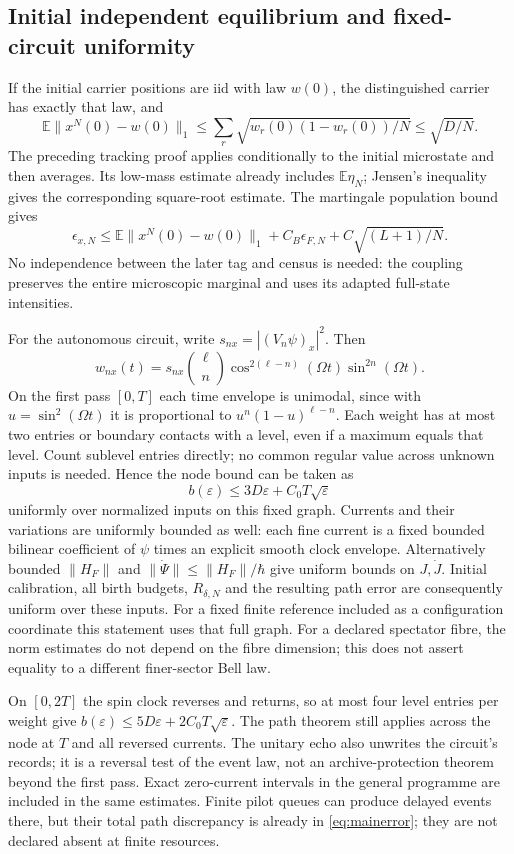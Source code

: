 \documentclass[11pt]{article}
\theoremstyle{definition}\newtheorem{definition}[theorem]{Definition}
\theoremstyle{remark}\newtheorem{remark}[theorem]{Remark}
\newcommand{\E}{\mathbb E}\newcommand{\Prb}{\mathbb P}
\begin{document}
\subsection{Initial independent equilibrium and fixed-circuit uniformity}
If the initial carrier positions are iid with law $w(0)$, the distinguished carrier has exactly that law, and
\[
 \E\|x^N(0)-w(0)\|_1
 \le \sum_r\sqrt{w_r(0)(1-w_r(0))/N}\le\sqrt{D/N}.
\]
The preceding tracking proof applies conditionally to the initial microstate and then averages. Its low-mass estimate already includes $\mathbb E\eta_N$; Jensen's inequality gives the corresponding square-root estimate. The martingale population bound gives
\[
 \epsilon_{x,N}\le \E\|x^N(0)-w(0)\|_1
       +C_B\epsilon_{F,N}+C\sqrt{(L+1)/N}.
\]
No independence between the later tag and census is needed: the coupling preserves the entire microscopic marginal and uses its adapted full-state intensities.

For the autonomous circuit, write $s_{nx}=|(V_n\psi)_x|^2$. Then
\[
 w_{nx}(t)=s_{nx}\binom{\ell}{n}
  \cos^{2(\ell-n)}(\Omega t)\sin^{2n}(\Omega t).
\]
On the first pass $[0,T]$ each time envelope is unimodal, since with $u=\sin^2(\Omega t)$ it is proportional to $u^n(1-u)^{\ell-n}$. Each weight has at most two entries or boundary contacts with a level, even if a maximum equals that level. Count sublevel entries directly; no common regular value across unknown inputs is needed. Hence the node bound can be taken as
\[
 b(\varepsilon)\le 3D\varepsilon+C_0T\sqrt\varepsilon
\]
uniformly over normalized inputs on this fixed graph. Currents and their variations are uniformly bounded as well: each fine current is a fixed bounded bilinear coefficient of $\psi$ times an explicit smooth clock envelope. Alternatively bounded $\|H_F\|$ and $\|\dot\Psi\|\le\|H_F\|/\hbar$ give uniform bounds on $J,\dot J$. Initial calibration, all birth budgets, $R_{\delta,N}$ and the resulting path error are consequently uniform over these inputs. For a fixed finite reference included as a configuration coordinate this statement uses that full graph. For a declared spectator fibre, the norm estimates do not depend on the fibre dimension; this does not assert equality to a different finer-sector Bell law.

On $[0,2T]$ the spin clock reverses and returns, so at most four level entries per weight give $b(\varepsilon)\le5D\varepsilon+2C_0T\sqrt\varepsilon$. The path theorem still applies across the node at $T$ and all reversed currents. The unitary echo also unwrites the circuit's records; it is a reversal test of the event law, not an archive-protection theorem beyond the first pass. Exact zero-current intervals in the general programme are included in the same estimates. Finite pilot queues can produce delayed events there, but their total path discrepancy is already in \eqref{eq:mainerror}; they are not declared absent at finite resources.
\end{document}
